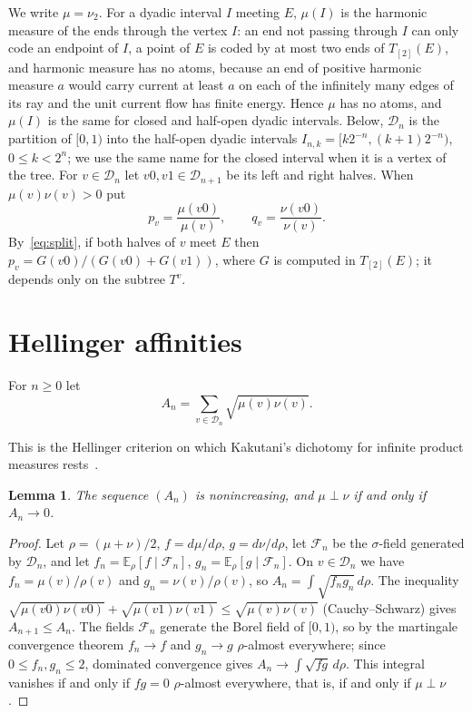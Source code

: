 \documentclass[11pt]{amsart}
\newtheorem{lemma}[theorem]{Lemma}
\theoremstyle{remark}
\newcommand{\cD}{\mathcal D}
\newcommand{\cF}{\mathcal F}
\begin{document}
We write $\mu=\nu_2$. For a dyadic interval $I$ meeting $E$, $\mu(I)$ is the harmonic measure of the ends through the vertex $I$: an end not passing through $I$ can only code an endpoint of $I$, a point of $E$ is coded by at most two ends of $T_{[2]}(E)$, and harmonic measure has no atoms, because an end of positive harmonic measure $a$ would carry current at least $a$ on each of the infinitely many edges of its ray and the unit current flow has finite energy. Hence $\mu$ has no atoms, and $\mu(I)$ is the same for closed and half-open dyadic intervals. Below, $\cD_n$ is the partition of $[0,1)$ into the half-open dyadic intervals $I_{n,k}=[k2^{-n},(k+1)2^{-n})$, $0\le k<2^n$; we use the same name for the closed interval when it is a vertex of the tree. For $v\in\cD_n$ let $v0,v1\in\cD_{n+1}$ be its left and right halves. When $\mu(v)\nu(v)>0$ put
\[
p_v=\frac{\mu(v0)}{\mu(v)},\qquad q_v=\frac{\nu(v0)}{\nu(v)}.
\]
By~\eqref{eq:split}, if both halves of $v$ meet $E$ then $p_v=G(v0)/(G(v0)+G(v1))$, where $G$ is computed in $T_{[2]}(E)$; it depends only on the subtree $T^v$.

\section{Hellinger affinities}\label{sec:hellinger}

For $n\ge0$ let
\[
A_n=\sum_{v\in\cD_n}\sqrt{\mu(v)\nu(v)}.
\]

This is the Hellinger criterion on which Kakutani's dichotomy for infinite product measures rests~\cite{Kakutani}.

\begin{lemma}\label{lem:hellinger}
The sequence $(A_n)$ is nonincreasing, and $\mu\perp\nu$ if and only if $A_n\to0$.
\end{lemma}

\begin{proof}
Let $\rho=(\mu+\nu)/2$, $f=d\mu/d\rho$, $g=d\nu/d\rho$, let $\cF_n$ be the $\sigma$-field generated by $\cD_n$, and let $f_n=\mathbb E_\rho[f\mid\cF_n]$, $g_n=\mathbb E_\rho[g\mid\cF_n]$. On $v\in\cD_n$ we have $f_n=\mu(v)/\rho(v)$ and $g_n=\nu(v)/\rho(v)$, so $A_n=\int\sqrt{f_ng_n}\,d\rho$. The inequality $\sqrt{\mu(v0)\nu(v0)}+\sqrt{\mu(v1)\nu(v1)}\le\sqrt{\mu(v)\nu(v)}$ (Cauchy--Schwarz) gives $A_{n+1}\le A_n$. The fields $\cF_n$ generate the Borel field of $[0,1)$, so by the martingale convergence theorem $f_n\to f$ and $g_n\to g$ $\rho$-almost everywhere; since $0\le f_n,g_n\le2$, dominated convergence gives $A_n\to\int\sqrt{fg}\,d\rho$. This integral vanishes if and only if $fg=0$ $\rho$-almost everywhere, that is, if and only if $\mu\perp\nu$.
\end{proof}
\end{document}
